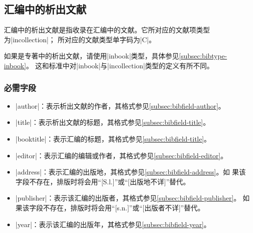 
\subsection{汇编中的析出文献}\label{subsec:bibtype-incollection}

汇编中的析出文献是指收录在汇编中的文献。它所对应的{\BibTeX}文献项类型为|incollection|；
所对应的文献类型单字码为|C|\cite{gbt3469-1983}。

\begin{note}
如果是专著中的析出文献，请使用|inbook|类型，具体参见\ref{subsec:bibtype-inbook}。
这和标准{\BibTeX}中对|inbook|与|incollection|类型的定义有所不同。
\end{note}

\subsubsection{必需字段}

\begin{itemize}
\item |author|：表示析出文献的作者，其格式参见\ref{subsec:bibfield-author}。
\item |title|：表示析出文献的标题，其格式参见\ref{subsec:bibfield-title}。
\item |booktitle|：表示汇编的标题，其格式参见\ref{subsec:bibfield-title}。
\item |editor|：表示汇编的编辑或作者，其格式参见\ref{subsec:bibfield-editor}。
\item |address|：表示汇编的出版地，其格式参见\ref{subsec:bibfield-address}。如
  果该字段不存在，{\BibTeX}排版时将会用``[S.l.]''或``[出版地不详]''替代。
\item |publisher|：表示该汇编的出版者，其格式参见\ref{subsec:bibfield-publisher}。
  如果该字段不存在，{\BibTeX}排版时将会用``[s.n.]''或``[出版者不详]''替代。
\item |year|：表示该汇编的出版年，其格式参见\ref{subsec:bibfield-year}。
\end{itemize}

